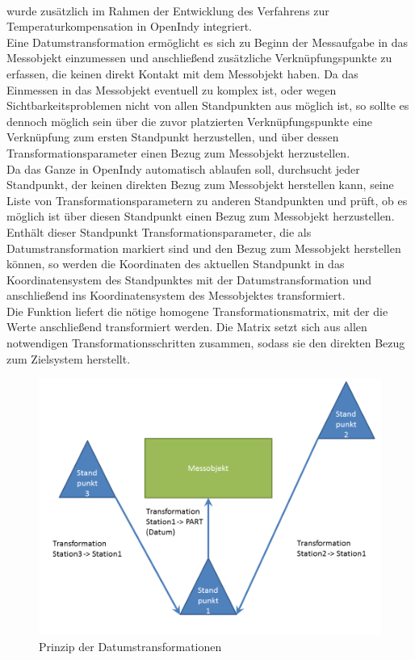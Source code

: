 \paragraph{}\label{sec:datumtrafo} wurde zusätzlich im Rahmen der Entwicklung des Verfahrens zur Temperaturkompensation in OpenIndy integriert.\\
Eine Datumstransformation ermöglicht es sich zu Beginn der Messaufgabe in das Messobjekt einzumessen und anschließend zusätzliche Verknüpfungspunkte zu erfassen, die keinen direkt Kontakt mit dem Messobjekt haben. Da das Einmessen in das Messobjekt eventuell zu komplex ist, oder wegen Sichtbarkeitsproblemen nicht von allen Standpunkten aus möglich ist, so sollte es dennoch möglich sein über die zuvor platzierten Verknüpfungspunkte eine Verknüpfung zum ersten Standpunkt herzustellen, und über dessen Transformationsparameter einen Bezug zum Messobjekt herzustellen.\\
Da das Ganze in OpenIndy automatisch ablaufen soll, durchsucht jeder Standpunkt, der keinen direkten Bezug zum Messobjekt herstellen kann, seine Liste von Transformationsparametern zu anderen Standpunkten und prüft, ob es möglich ist über diesen Standpunkt einen Bezug zum Messobjekt herzustellen. Enthält dieser Standpunkt Transformationsparameter, die als Datumstransformation markiert sind und den Bezug zum Messobjekt herstellen können, so werden die Koordinaten des aktuellen Standpunkt in das Koordinatensystem des Standpunktes mit der Datumstransformation und anschließend ins Koordinatensystem des Messobjektes transformiert.\\
Die Funktion  liefert die nötige homogene Transformationsmatrix, mit der die Werte anschließend transformiert werden. Die Matrix setzt sich aus allen notwendigen Transformationsschritten zusammen, sodass sie den direkten  Bezug zum Zielsystem herstellt.
\begin{figure}[h]
	\label{fig:datumstransformation}
	\centering
		\includegraphics[scale=1.6]{bilder/datumtransformation}
	\caption{Prinzip der Datumstransformationen}
\end{figure}
\newpage  

